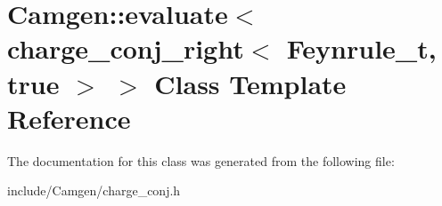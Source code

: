 \hypertarget{a00151}{}\section{Camgen\+:\+:evaluate$<$ charge\+\_\+conj\+\_\+right$<$ Feynrule\+\_\+t, true $>$ $>$ Class Template Reference}
\label{a00151}


The documentation for this class was generated from the following file\+:\begin{DoxyCompactItemize}
\item 
include/\+Camgen/charge\+\_\+conj.\+h\end{DoxyCompactItemize}
